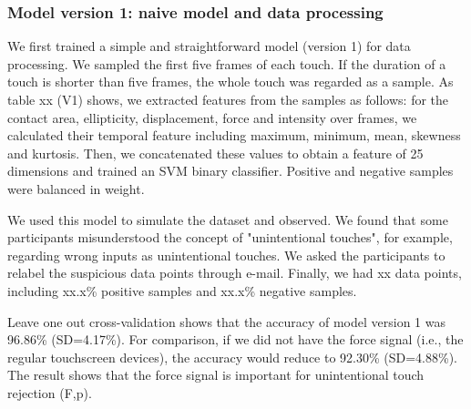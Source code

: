 \subsubsection{Model version 1: naive model and data processing}

We first trained a simple and straightforward model (version 1) for data processing. We sampled the first five frames of each touch. If the duration of a touch is shorter than five frames, the whole touch was regarded as a sample. As table xx (V1) shows, we extracted features from the samples as follows: for the contact area, ellipticity, displacement, force and intensity over frames, we calculated their temporal feature including maximum, minimum, mean, skewness and kurtosis. Then, we concatenated these values to obtain a feature of 25 dimensions and trained an SVM binary classifier. Positive and negative samples were balanced in weight.


We used this model to simulate the dataset and observed. We found that some participants misunderstood the concept of "unintentional touches", for example, regarding wrong inputs as unintentional touches. We asked the participants to relabel the suspicious data points through e-mail. Finally, we had xx data points, including xx.x\% positive samples and xx.x\% negative samples.


Leave one out cross-validation shows that the accuracy of model version 1 was 96.86\% (SD=4.17\%). For comparison, if we did not have the force signal (i.e., the regular touchscreen devices), the accuracy would reduce to 92.30\% (SD=4.88\%). The result shows that the force signal is important for unintentional touch rejection (F,p).

